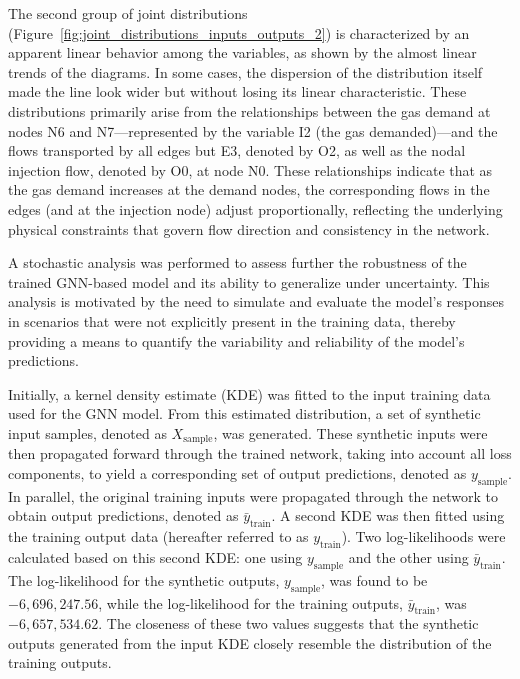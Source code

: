The second group of joint distributions (Figure~\cref{fig:joint_distributions_inputs_outputs_2}) is characterized by an apparent linear behavior among the variables, as shown by the almost linear trends of the diagrams. In some cases, the dispersion of the distribution itself made the line look wider but without losing its linear characteristic. These distributions primarily arise from the relationships between the gas demand at nodes N6 and N7—represented by the variable I2 (the gas demanded)—and the flows transported by all edges but E3, denoted by O2, as well as the nodal injection flow, denoted by O0, at node N0. These relationships indicate that as the gas demand increases at the demand nodes, the corresponding flows in the edges (and at the injection node) adjust proportionally, reflecting the underlying physical constraints that govern flow direction and consistency in the network.







A stochastic analysis was performed to assess further the robustness of the trained GNN-based model and its ability to generalize under uncertainty. This analysis is motivated by the need to simulate and evaluate the model's responses in scenarios that were not explicitly present in the training data, thereby providing a means to quantify the variability and reliability of the model's predictions.

Initially, a kernel density estimate (KDE) was fitted to the input training data used for the GNN model. From this estimated distribution, a set of synthetic input samples, denoted as \( X_{\text{sample}} \), was generated. These synthetic inputs were then propagated forward through the trained network, taking into account all loss components, to yield a corresponding set of output predictions, denoted as \( y_{\text{sample}} \). In parallel, the original training inputs were propagated through the network to obtain output predictions, denoted as \(\bar{y}_{\text{train}}\). A second KDE was then fitted using the training output data (hereafter referred to as \(y_{\text{train}}\)). Two log-likelihoods were calculated based on this second KDE: one using \(y_{\text{sample}}\) and the other using \(\bar{y}_{\text{train}}\). The log-likelihood for the synthetic outputs, \(y_{\text{sample}}\), was found to be \(-6,696,247.56\), while the log-likelihood for the training outputs, \(\bar{y}_{\text{train}}\), was \(-6,657,534.62\). The closeness of these two values suggests that the synthetic outputs generated from the input KDE closely resemble the distribution of the training outputs.


